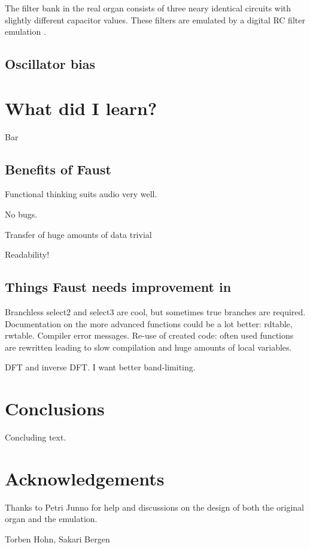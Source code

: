 \documentclass[11pt,a4paper]{article}
\begin{document}
The filter bank in the real organ consists of three neary identical circuits with slightly different capacitor values. These filters are emulated by a digital RC filter emulation\cite{rc-filter} \cite{rc-irc}.








\subsection{Oscillator bias}
\label{section:oscillator-bias}

\section{What did I learn?}

Bar


\subsection{Benefits of Faust}

Functional thinking suits audio very well.

No bugs.

Transfer of huge amounts of data trivial

Readability!


\subsection{Things Faust needs improvement in}

Branchless select2 and select3 are cool, but sometimes true branches are required.
Documentation on the more advanced functions could be a lot better: rdtable, rwtable.
Compiler error messages.
Re-use of created code: often used functions are rewritten leading to slow compilation and huge amounts of local variables.

DFT and inverse DFT. I want better band-limiting.

\section{Conclusions}

Concluding text.

\section{Acknowledgements}

Thanks to Petri Junno for help and discussions on the design of both the original organ and the emulation.

Torben Hohn, Sakari Bergen





\end{document}
